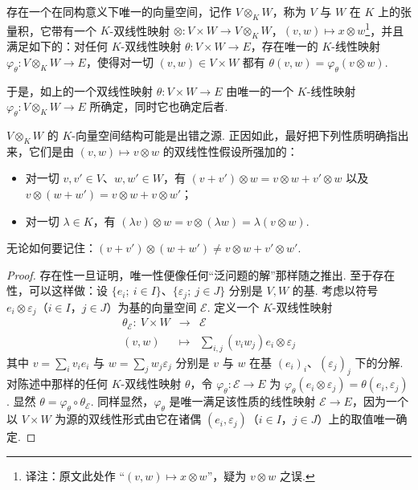 \begin{proposition}\label{prop:fg-4-1-19}
存在一个在同构意义下唯一的向量空间，记作 $V\otimes_K W$，称为 $V$ 与 $W$ 在 $K$ 上的张量积，它带有一个 $K$-双线性映射 $\otimes:V\times W\longrightarrow V\otimes_K W$，$(v,w)\mapsto x\otimes w$\footnote{译注：原文此处作 ``$(v,w)\mapsto x\otimes w$''，疑为 $v\otimes w$ 之误.}，并且满足如下的：对任何 $K$-双线性映射 $\theta:V\times W\longrightarrow E$，存在唯一的 $K$-线性映射 $\varphi_\theta:V\otimes_K W\longrightarrow E$，使得对一切 $(v,w)\in V\times W$ 都有 $\theta(v,w)=\varphi_\theta(v\otimes w)$.
\end{proposition}

于是，如上的一个双线性映射 $\theta:V\times W\longrightarrow E$ 由唯一的一个 $K$-线性映射 $\varphi_\theta:V\otimes_K W\longrightarrow E$ 所确定，同时它也确定后者.

$V\otimes_K W$ 的 $K$-向量空间结构可能是出错之源. 正因如此，最好把下列性质明确指出来，它们是由 $(v,w)\mapsto v\otimes w$ 的双线性性假设所强加的：
\begin{itemize}[label=--]
\item 对一切 $v,v'\in V$、$w,w'\in W$，有 $(v+v')\otimes w=v\otimes w+v'\otimes w$ 以及 $v\otimes(w+w')=v\otimes w+v\otimes w'$；
\item 对一切 $\lambda\in K$，有 $(\lambda v)\otimes w=v\otimes(\lambda w)=\lambda(v\otimes w)$.
\end{itemize}
无论如何要记住：$(v+v')\otimes(w+w')\neq v\otimes w+v'\otimes w'$.

\begin{proof}
存在性一旦证明，唯一性便像任何``泛问题的解''那样随之推出. 至于存在性，可以这样做：设 $\{e_i;\ i\in I\}$、$\{\varepsilon_j;\ j\in J\}$ 分别是 $V,W$ 的基. 考虑以符号 $e_i\otimes\varepsilon_j$（$i\in I$，$j\in J$）为基的向量空间 $\mathcal{E}$. 定义一个 $K$-双线性映射
\[
\begin{array}{rcl}
\theta_{\mathcal{E}}:\ V\times W & \longrightarrow & \mathcal{E}\\
(v,w) & \longmapsto & \sum_{i,j}(v_iw_j)e_i\otimes\varepsilon_j
\end{array}
\]
其中 $v=\sum_i v_ie_i$ 与 $w=\sum_j w_j\varepsilon_j$ 分别是 $v$ 与 $w$ 在基 $(e_i)_i$、$(\varepsilon_j)_j$ 下的分解. 对陈述中那样的任何 $K$-双线性映射 $\theta$，令 $\varphi_\theta:\mathcal{E}\longrightarrow E$ 为 $\varphi_\theta(e_i\otimes\varepsilon_j)=\theta(e_i,\varepsilon_j)$. 显然 $\theta=\varphi_\theta\circ\theta_{\mathcal{E}}$. 同样显然，$\varphi_\theta$ 是唯一满足该性质的线性映射 $\mathcal{E}\longrightarrow E$，因为一个以 $V\times W$ 为源的双线性形式由它在诸偶 $(e_i,\varepsilon_j)$（$i\in I$，$j\in J$）上的取值唯一确定.
\end{proof}

